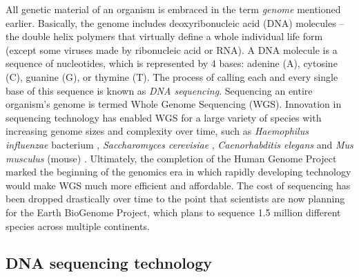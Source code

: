 All genetic material of an organism is embraced in the term \emph{genome} mentioned earlier. Basically, the genome includes deoxyribonucleic acid (DNA) molecules -- the double helix polymers \cite{Watson1953} that virtually define a whole individual life form (except some viruses made by ribonucleic acid or RNA). 
A DNA molecule is a sequence of nucleotides, which is represented by 4 bases: adenine (A), cytosine (C), guanine (G), or thymine (T). The process of calling each and every single base of this sequence is known as \emph{DNA sequencing}. Sequencing an entire organism's genome is termed Whole Genome Sequencing (WGS). 
Innovation in sequencing technology has enabled WGS for a large variety of species with increasing genome sizes and complexity  over time, such as \emph{Haemophilus influenzae} bacterium \cite{Fleischmann1995}, \emph{Saccharomyces cerevisiae} \cite{Goffeau1996}, \emph{Caenorhabditis elegans} \cite{Sequencing1998} and \emph{Mus musculus} (mouse) \cite{Chinwalla2002}. Ultimately, the completion of the Human Genome Project \cite*{International2004} marked the beginning of the genomics era in which rapidly developing technology would make WGS much more efficient and affordable.
The cost of sequencing has been dropped drastically over time to the point that scientists are now planning for the Earth BioGenome Project, which plans to sequence 1.5 million different species across multiple continents\cite{Lewin2018earth}.

\subsection{DNA sequencing technology}

